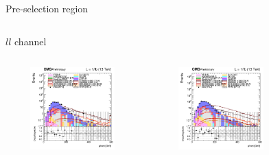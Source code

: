 \documentclass[8pt]{beamer}
\begin{document}
\begin{frame}{Pre-selection region}
\begin{columns}
\begin{column}{1.09\textwidth}
\begin{block}{\centering $ll$ channel}\end{block}
\end{column}
\end{columns} \vspace{-5pt}
\begin{columns}
		\begin{column}{0.33\textwidth}
			\begin{center}
			\vspace{-8pt}
			\begin{block}{}\end{block}\vspace{10pt}
     			\includegraphics[width=1.0\textwidth, height=90pt]{figs/2016/log_cratio_topCR_ll_METcorrected_pt.png}
    		\end{center}		
		\end{column} 
		\begin{column}{0.33\textwidth}
			\begin{center}
			\vspace{-8pt}
			\begin{block}{}\end{block}\vspace{10pt}
     			\includegraphics[width=1.0\textwidth, height=90pt]{figs/2017/log_cratio_topCR_ll_METcorrected_pt.png}
    		\end{center}		
		\end{column} 
		\begin{column}{0.33\textwidth}
			\begin{center}
			\vspace{-8pt}

\end{center}
\end{column}
\end{columns}
\end{frame}
\end{document}
